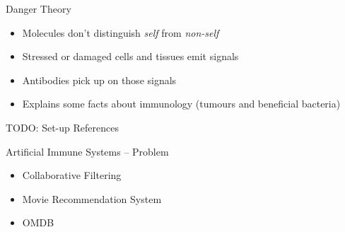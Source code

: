 \documentclass[xcolor=svgnames]{beamer}
\begin{document}
    \begin{frame}{Danger Theory}
		\begin{itemize}
		    \item Molecules don't distinguish \textit{self} from \textit{non-self}
            \item Stressed or damaged cells and tissues emit signals
	        \item Antibodies pick up on those signals
	        \item Explains some facts about immunology (tumours and beneficial bacteria)
	    \end{itemize}
	\end{frame}

    \begin{frame}
    	TODO: Set-up References
    \end{frame}     
            
	\begin{frame}{Artificial Immune Systems -- Problem}
        \begin{itemize}
			\item Collaborative Filtering
            \item Movie Recommendation System
            \item OMDB
		\end{itemize}
   \end{frame}
\end{document}
